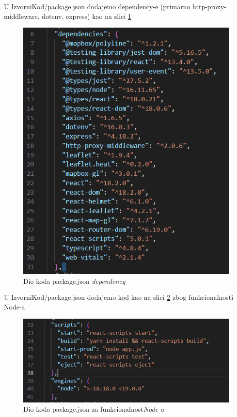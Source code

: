 			\begin{packed_item}
				\item U IzvorniKod/package.json dodajemo dependency-e (primarno http-proxy-middleware, dotenv, express) kao na slici \ref{fig:frontendDeploy1}
				
			\begin{figure}[H]
				\includegraphics[scale=1]{slike/frontendDeploy1.png}
				\centering
				\caption{Dio koda package.json \textit{dependency}}
				\label{fig:frontendDeploy1}
			\end{figure}
			
				\item U IzvorniKod/package.json dodajemo kod kao na slici \ref{fig:frontendDeploy2} zbog funkcionalnosti Node-a
				
			\begin{figure}[H]
				\includegraphics[scale=1]{slike/frontendDeploy2.png}
				\centering
				\caption{Dio koda package.json za funkcionalnost\textit{Node-a}}
				\label{fig:frontendDeploy2}
			\end{figure}
			

\end{packed_item}
